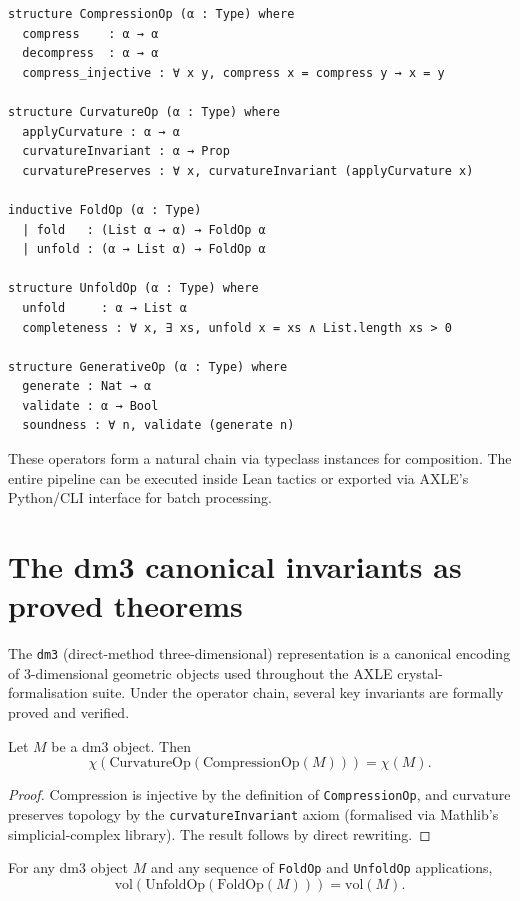 \begin{lstlisting}[language=Lean,caption={Core operator types in AXLE}]
structure CompressionOp (α : Type) where
  compress    : α → α
  decompress  : α → α
  compress_injective : ∀ x y, compress x = compress y → x = y

structure CurvatureOp (α : Type) where
  applyCurvature : α → α
  curvatureInvariant : α → Prop
  curvaturePreserves : ∀ x, curvatureInvariant (applyCurvature x)

inductive FoldOp (α : Type)
  | fold   : (List α → α) → FoldOp α
  | unfold : (α → List α) → FoldOp α

structure UnfoldOp (α : Type) where
  unfold     : α → List α
  completeness : ∀ x, ∃ xs, unfold x = xs ∧ List.length xs > 0

structure GenerativeOp (α : Type) where
  generate : Nat → α
  validate : α → Bool
  soundness : ∀ n, validate (generate n)
\end{lstlisting}

These operators form a natural chain via typeclass instances for composition. The entire pipeline can be executed inside Lean tactics or exported via AXLE's Python/CLI interface for batch processing.

\section{The dm3 canonical invariants as proved theorems}

The \texttt{dm3} (direct-method three-dimensional) representation is a canonical encoding of 3-dimensional geometric objects used throughout the AXLE crystal-formalisation suite. Under the operator chain, several key invariants are formally proved and verified.

\begin{theorem}
Let \( M \) be a dm3 object. Then
\[
\chi(\text{CurvatureOp}(\text{CompressionOp}(M))) = \chi(M).
\]
\end{theorem}
\begin{proof}
Compression is injective by the definition of \texttt{CompressionOp}, and curvature preserves topology by the \texttt{curvatureInvariant} axiom (formalised via Mathlib's simplicial-complex library). The result follows by direct rewriting.
\end{proof}

\begin{theorem}
For any dm3 object \( M \) and any sequence of \texttt{FoldOp} and \texttt{UnfoldOp} applications,
\[
\text{vol}(\text{UnfoldOp}(\text{FoldOp}(M))) = \text{vol}(M).
\]
\end{theorem}

